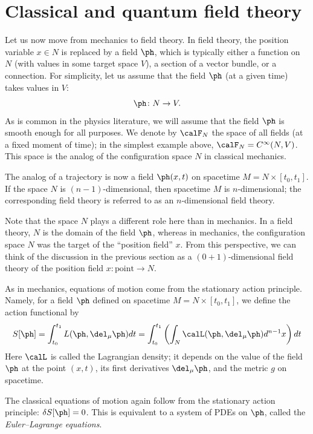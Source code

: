 \section{Classical and quantum field theory}\label{s:field-theory}
Let us now move from mechanics to field theory. In field theory,
the position variable $x\in N$ is replaced by a field $\ph$,
which is typically either a function on $N$ (with values in some target space
$V$), a section of a vector bundle, or a connection. For simplicity, let us
assume that the field $\ph$ (at a given time) takes values in $V$:
\begin{equation*}
	\ph\colon N \rightarrow V.
\end{equation*}
As is common in the physics literature, we will assume that the field $\ph$
is smooth enough for all purposes. We denote by $\calF_N$ the space of all
fields (at a fixed moment of time); in the simplest example above,
$\calF_N=C^\infty (N,V)$. This space is the analog of the configuration space
$N$ in classical mechanics.

The analog of a trajectory is now a field $\ph(x,t)$ on spacetime $M = N
\times [t_0,t_1]$. If the space $N$ is $(n-1)$-dimensional, then
spacetime $M$ is $n$-dimensional; the corresponding field theory is referred
to as an $n$-dimensional field theory.


 Note that the space $N$ plays a different role here than in mechanics. In
 a field theory, $N$ is the domain of the field $\ph$, whereas in mechanics, the
 configuration space $N$ was the target of the ``position field'' $x$. From this
 perspective, we can think of the discussion in the previous section as a
 $(0+1)$-dimensional field theory of the position field $x\colon \text{point}
 \to N$.

As in mechanics, equations of motion come from the stationary action principle.
Namely, for a field $\ph$ defined on spacetime $M=N\times[t_0, t_1]$, we define
the action functional by
\begin{equation}
	S[\ph] = \int_{t_0}^{t_1} L(\ph, \del_{\mu} \ph) dt = \int_{t_0}^{t_1} \left(
	\int_N \calL(\ph, \del_{\mu} \ph) d^{n-1} x \right) dt
\end{equation}
Here $\calL$ is called the Lagrangian density; it depends on the value of the
field $\ph$ at the point $(x,t)$, its first derivatives $\del_\mu \ph$, and the
metric $g$ on spacetime.

The classical equations of motion again follow from the stationary action
principle: $\delta S[\ph]=0$. This is equivalent to a system of PDEs on
$\ph$, called the \emph{Euler--Lagrange equations}.

